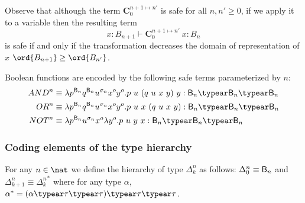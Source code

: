 Observe that although the term $\mathbf{C}^{n+1\mapsto n'}_0$ is safe for all $n,n'\geq 0$, if we apply it to a variable then the resulting term
$$ x:B_{n+1} \vdash \mathbf{C}_0^{n+1\mapsto n'}~x : B_{n}$$
is safe if and only if the transformation decreases the domain of representation of $x$ \ie $\ord{B_{n+1}}\geq\ord{B_{n'}}$.


Boolean functions are encoded by the following safe terms parameterized by $n$:
\begin{align*}
AND^n &\equiv \lambda p^{\booltype_n} q^{\booltype_n} u^{\sigma_n} x^o y^o . p~u~(q~u~x~y)~y : \booltype_n\typear\booltype_n\typear\booltype_n \\
OR^n &\equiv \lambda p^{\booltype_n} q^{\booltype_n} u^{\sigma_n} x^o y^o . p~u~x~(q~u~x~y) : \booltype_n\typear\booltype_{n}\typear\booltype_n \\
NOT^n &\equiv \lambda p^{\booltype_n} u^{\sigma_n} x^o \lambda y^o . p~u~y~x : \booltype_n\typear\booltype_n\typear\booltype_n
\end{align*}

\subsubsection{Coding elements of the type hierarchy}
For any $n\in\nat$ we define the hierarchy of type $\Delta_k^n$ as follows:
$\Delta_0^n \equiv \mathsf{B}_n$ and $\Delta_{k+1}^n \equiv {\Delta_k^n}^*$ where for any type $\alpha$, $\alpha^* = (\alpha \typear \tau \typear \tau)\typear \tau \typear \tau$.

